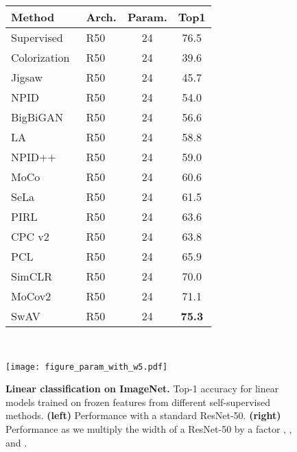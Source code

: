 \documentclass{article}
\def\OURS{SwAV\xspace}
\newcommand{\resnetfifty}{R50}
\newcommand{\ImNet}{ImageNet\xspace}
\begin{document}
\begin{figure}[t!]
\begin{minipage}{0.45\linewidth}
\centering
    \begin{tabular}{@{} l l c c @{}}
      \toprule
      Method      & Arch. & Param. & Top1  \\
      \midrule
      Supervised  & \resnetfifty    & 24  & 76.5  \\
\midrule
      Colorization~\cite{zhang2016colorful}     & \resnetfifty  & 24 & 39.6 \\
      Jigsaw~\cite{noroozi2016unsupervised}     & \resnetfifty  & 24 & 45.7 \\
      NPID~\cite{wu2018unsupervised}   & \resnetfifty  & 24 & 54.0   \\
      BigBiGAN~\cite{donahue2019large} & \resnetfifty  & 24 & 56.6   \\
      LA~\cite{zhuang2019local}        & \resnetfifty  & 24 & 58.8 \\
      NPID++~\cite{misra2019self}      & \resnetfifty  & 24 & 59.0   \\
      MoCo~\cite{he2019momentum}       & \resnetfifty  & 24 & 60.6   \\
      SeLa~\cite{asano2019self}        & \resnetfifty  & 24 & 61.5   \\
      PIRL~\cite{misra2019self}        & \resnetfifty  & 24 & 63.6   \\
      CPC v2~\cite{henaff2019data}     & \resnetfifty  & 24 & 63.8 \\
      PCL~\cite{li2020prototypical}     & \resnetfifty  & 24 & 65.9 \\
      SimCLR~\cite{chen2020simple}     & \resnetfifty  & 24 & 70.0  \\
      MoCov2~\cite{chen2020improved}   & \resnetfifty  & 24 & 71.1  \\
\midrule
      \OURS   		       & \resnetfifty  & 24 & \bf{75.3}        \\ 
      \bottomrule
 \end{tabular}
\end{minipage}
~~~~~\begin{minipage}{0.5\linewidth}
\centering
\texttt{[image: figure\_param\_with\_w5.pdf]} 
\end{minipage}
    \caption{
      \textbf{Linear classification on \ImNet.} 
Top-1 accuracy for linear models trained on frozen features from different self-supervised methods.
\textbf{(left)}
Performance with a standard ResNet-50.
\textbf{(right)} Performance as we multiply the width of a ResNet-50 by a factor , , and .
}
    \label{fig:linear_inet}
\end{figure}
\end{document}
